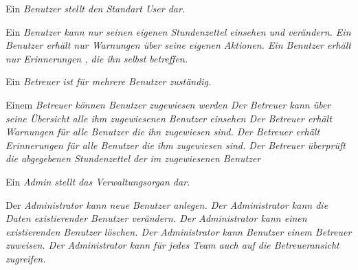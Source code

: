 \begin{requirements}
    Ein \em Benutzer \em stellt den Standart User dar.
    \begin{requirements}
         Ein \em Benutzer \em kann nur seinen eigenen \em Stundenzettel \em einsehen und verändern.
         Ein \em Benutzer \em erhält nur \em Warnungen \em über seine eigenen Aktionen.
         Ein \em Benutzer \em erhält nur \em Erinnerungen \em, die ihn selbst betreffen.
    \end{requirements}

        Ein \em Betreuer \em ist für mehrere \em Benutzer \em zuständig.
        \begin{requirements}
             Einem \em Betreuer \em können \em Benutzer \em zugewiesen werden
             Der \em Betreuer \em kann über seine Übersicht alle ihm zugewiesenen \em Benutzer \em einsehen
             Der \em Betreuer \em erhält \em Warnungen \em für alle \em Benutzer \em die ihn zugewiesen sind.
             Der \em Betreuer \em erhält \em Erinnerungen \em für alle \em Benutzer \em die ihm zugewiesen sind.
             Der \em Betreuer \em überprüft die \em abgegebenen Stundenzettel \em der im zugewiesenen \em Benutzer \em
        \end{requirements}

        Ein \em Admin \em stellt das Verwaltungsorgan dar.
        \begin{requirements}
             Der \em Administrator \em kann neue \em Benutzer \em anlegen.
             Der \em Administrator \em kann die Daten existierender \em Benutzer \em verändern.
             Der \em Administrator \em kann einen existierenden \em Benutzer \em löschen.
             Der \em Administrator \em kann \em Benutzer \em einem \em Betreuer \em zuweisen.
             Der \em Administrator \em kann für jedes \em Team \em auch auf die \em Betreueransicht \em zugreifen.
        \end{requirements}
\end{requirements}

